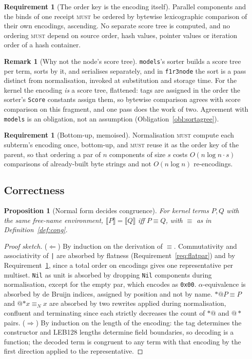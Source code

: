 \documentclass[11pt,a4paper]{article}
\newcommand{\code}[1]{\texttt{#1}}
\newcommand{\MUST}{\textsc{must}}
\newcommand{\enc}[1]{\llbracket #1 \rrbracket}
\theoremstyle{definition}
\newtheorem{requirement}[definition]{Requirement}
\newtheorem{remark}[definition]{Remark}
\theoremstyle{plain}
\newtheorem{proposition}[definition]{Proposition}
\begin{document}
\begin{requirement}[The order key is the encoding itself]\label{req:sortkey}
Parallel components and the binds of one receipt \MUST{} be ordered by bytewise
lexicographic comparison of their own encodings, ascending. No separate score
tree is computed, and no ordering \MUST{} depend on source order, hash values,
pointer values or iteration order of a hash container.
\end{requirement}

\begin{remark}[Why not the node's score tree]
\code{models}'s sorter builds a score tree per term, sorts by it, and serialises
separately, and in \code{f1r3node} the sort is a pass distinct from
normalisation, invoked at substitution and storage time. For the kernel the
encoding \emph{is} a score tree, flattened: tags are assigned in the order the
sorter's \code{Score} constants assign them, so bytewise comparison agrees with
score comparison on this fragment, and one pass does the work of two. Agreement
with \code{models} is an obligation, not an assumption
(Obligation~\ref{obl:sortagree}).
\end{remark}

\begin{requirement}[Bottom-up, memoised]
Normalisation \MUST{} compute each subterm's encoding once, bottom-up, and
\MUST{} reuse it as the order key of the parent, so that ordering a par of $n$
components of size $s$ costs $O(n\log n\cdot s)$ comparisons of already-built
byte strings and not $O(n\log n)$ re-encodings.
\end{requirement}

\subsection{Correctness}

\begin{proposition}[Normal form decides congruence]\label{prop:decides}
For kernel terms $P,Q$ with the same free-name environment,
$\enc{P}=\enc{Q}$ iff $P\equiv Q$, with $\equiv$ as in
Definition~\ref{def:cong}.
\end{proposition}
\begin{proof}[Proof sketch]
($\Leftarrow$) By induction on the derivation of $\equiv$. Commutativity and
associativity of \code{|} are absorbed by flatness
(Requirement~\ref{req:flatpar}) and by Requirement~\ref{req:sortkey}, since a
total order on encodings gives one representative per multiset. \code{Nil} as
unit is absorbed by dropping \code{Nil} components during normalisation, except
for the empty par, which encodes as \code{0x00}. $\alpha$-equivalence is
absorbed by de Bruijn indices, assigned by position and not by name.
$*@P \equiv P$ and $@{*x} \equiv_N x$ are absorbed by two rewrites applied during
normalisation, confluent and terminating since each strictly decreases the count
of $*@$ and $@*$ pairs. ($\Rightarrow$) By induction on the length of the
encoding: the tag determines the constructor and LEB128 lengths determine field
boundaries, so decoding is a function; the decoded term is congruent to any term
with that encoding by the first direction applied to the representative.
\end{proof}
\end{document}
